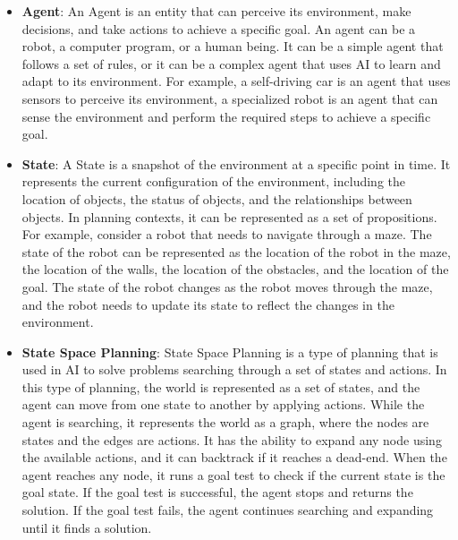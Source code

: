\begin{itemize}
      \item \textbf{Agent}: An Agent is an entity that can perceive its environment, make decisions, and take actions to achieve a specific goal. An agent can be a robot, a computer program, or a human being. It can be a simple agent that follows a set of rules, or it can be a complex agent that uses \ac{AI} to learn and adapt to its environment. For example, a self-driving car is an agent that uses sensors to perceive its environment, a specialized robot is an agent that can sense the environment and perform the required steps to achieve a specific goal.

      \item \textbf{State}: A State is a snapshot of the environment at a specific point in time. It represents the current configuration of the environment, including the location of objects, the status of objects, and the relationships between objects. In planning contexts, it can be represented as a set of propositions. For example, consider a robot that needs to navigate through a maze. The state of the robot can be represented as the location of the robot in the maze, the location of the walls, the location of the obstacles, and the location of the goal. The state of the robot changes as the robot moves through the maze, and the robot needs to update its state to reflect the changes in the environment.

      \item \label{def:state_space_planning}
            \textbf{State Space Planning}: State Space Planning is a type of planning that is used in \ac{AI} to solve problems searching through a set of states and actions. In this type of planning, the world is represented as a set of states, and the agent can move from one state to another by applying actions. While the agent is searching, it represents the world as a graph, where the nodes are states and the edges are actions. It has the ability to expand any node using the available actions, and it can backtrack if it reaches a dead-end. When the agent reaches any node, it runs a goal test to check if the current state is the goal state. If the goal test is successful, the agent stops and returns the solution. If the goal test fails, the agent continues searching and expanding until it finds a solution.


\end{itemize}
